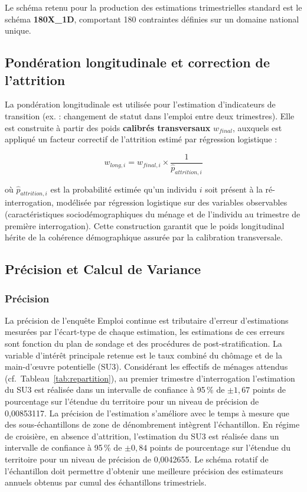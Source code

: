 \documentclass[12pt, a4paper]{article}
\begin{document}
Le schéma retenu pour la production des estimations trimestrielles standard est le schéma \textbf{180X\_1D}, comportant 180 contraintes définies sur un domaine national unique.

\subsection{Pondération longitudinale et correction de l'attrition}

La pondération longitudinale est utilisée pour l'estimation d'indicateurs de transition (ex. : changement de statut dans l'emploi entre deux trimestres). Elle est construite à partir des poids \textbf{calibrés transversaux} $w_{final}$, auxquels est appliqué un facteur correctif de l'attrition estimé par régression logistique :

\begin{equation}
  w_{long,i} = w_{final,i} \times \frac{1}{\hat{p}_{attrition,i}}
\end{equation}

où $\hat{p}_{attrition,i}$ est la probabilité estimée qu'un individu $i$ soit présent à la ré-interrogation, modélisée par régression logistique sur des variables observables (caractéristiques sociodémographiques du ménage et de l'individu au trimestre de première interrogation). Cette construction garantit que le poids longitudinal hérite de la cohérence démographique assurée par la calibration transversale.

\subsection{Précision et Calcul de Variance}

\subsubsection{Précision}

La précision de l'enquête Emploi continue est tributaire d'erreur d'estimations mesurées par l'écart-type de chaque estimation, les estimations de ces erreurs sont fonction du plan de sondage et des procédures de post-stratification. La variable d'intérêt principale retenue est le taux combiné du chômage et de la main-d'\oe{}uvre potentielle (SU3). Considérant les effectifs de ménages attendus (cf.\ Tableau~\ref{tab:repartition}), au premier trimestre d'interrogation l'estimation du SU3 est réalisée dans un intervalle de confiance à 95\,\% de $\pm1{,}67$ points de pourcentage sur l'étendue du territoire pour un niveau de précision de 0,00853117. La précision de l'estimation s'améliore avec le temps à mesure que des sous-échantillons de zone de dénombrement intègrent l'échantillon. En régime de croisière, en absence d'attrition, l'estimation du SU3 est réalisée dans un intervalle de confiance à 95\,\% de $\pm0{,}84$ points de pourcentage sur l'étendue du territoire pour un niveau de précision de 0,0042655. Le schéma rotatif de l'échantillon doit permettre d'obtenir une meilleure précision des estimateurs annuels obtenus par cumul des échantillons trimestriels.
\end{document}
